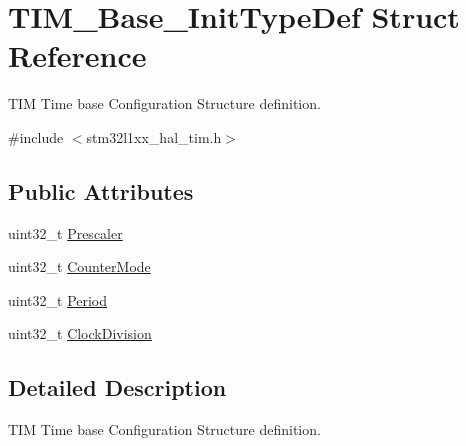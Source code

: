 \hypertarget{struct_t_i_m___base___init_type_def}{\section{T\-I\-M\-\_\-\-Base\-\_\-\-Init\-Type\-Def Struct Reference}
\label{struct_t_i_m___base___init_type_def}
}


T\-I\-M Time base Configuration Structure definition.  




{\ttfamily \#include $<$stm32l1xx\-\_\-hal\-\_\-tim.\-h$>$}

\subsection*{Public Attributes}
\begin{DoxyCompactItemize}
\item 
uint32\-\_\-t \hyperlink{struct_t_i_m___base___init_type_def_afc886119e6709bb576d25b5cf8d12d92}{Prescaler}
\item 
uint32\-\_\-t \hyperlink{struct_t_i_m___base___init_type_def_a16d0c02a8f35426360a64c0706656e35}{Counter\-Mode}
\item 
uint32\-\_\-t \hyperlink{struct_t_i_m___base___init_type_def_a8fab2bc184bb756763ff59c729b5be55}{Period}
\item 
uint32\-\_\-t \hyperlink{struct_t_i_m___base___init_type_def_ade59c3a547a5409da845592f30596d17}{Clock\-Division}
\end{DoxyCompactItemize}


\subsection{Detailed Description}
T\-I\-M Time base Configuration Structure definition. 

